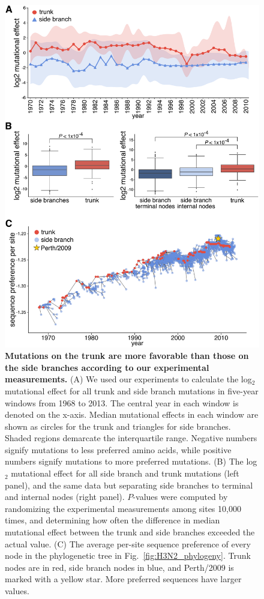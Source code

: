 \documentclass[9pt,twocolumn,twoside]{pnas-new}
\begin{document}
\begin{figure}
\centering
\includegraphics[width=\columnwidth]{figs/trunkvssidebranch/trunkvssidebranch.pdf}
\caption{\label{fig:trunkvssidebranch}
{\bf Mutations on the trunk are more favorable than those on the side branches according to our experimental measurements.}
(A) We used our experiments to calculate the log$_{2}$ mutational effect for all trunk and side branch mutations in five-year windows from 1968 to 2013. 
The central year in each window is denoted on the x-axis.
Median mutational effects in each window are shown as circles for the trunk and triangles for side branches. 
Shaded regions demarcate the interquartile range.
Negative numbers signify mutations to less preferred amino acids, while positive numbers signify mutations to more preferred mutations.
(B) The log$_{2}$ mutational effect for all side branch and trunk mutations (left panel), and the same data but separating side branches to terminal and internal nodes (right panel).
$P$-values were computed by randomizing the experimental measurements among sites 10,000 times, and determining how often the difference in median mutational effect between the trunk and side branches exceeded the actual value.
(C) The average per-site sequence preference of every node in the phylogenetic tree in Fig.~\ref{fig:H3N2_phylogeny}.
Trunk nodes are in red, side branch nodes in blue, and Perth/2009 is marked with a yellow star.
More preferred sequences have larger values.
}
\end{figure}
\end{document}
